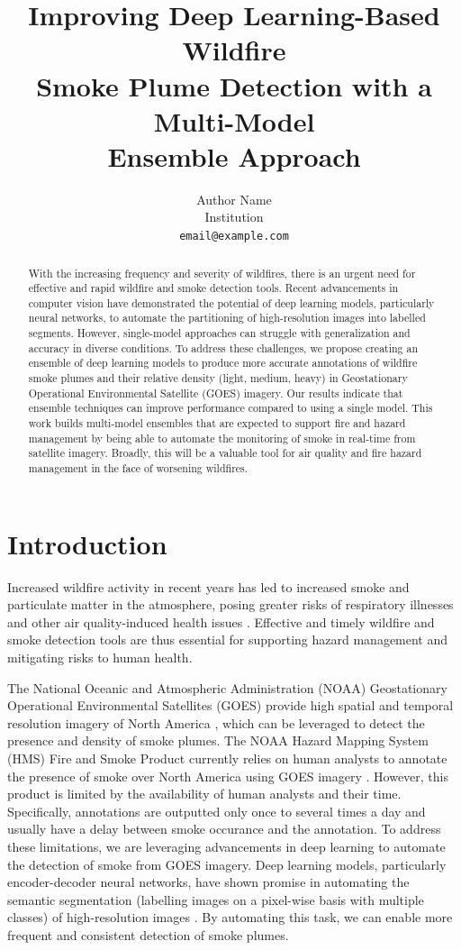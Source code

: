 \documentclass{article}
\title{Improving Deep Learning-Based Wildfire\\ Smoke Plume Detection with a Multi-Model\\ Ensemble Approach}
\author{Author Name \\
Institution \\
\texttt{email@example.com}
}
\begin{document}
\maketitle
\begin{abstract}
With the increasing frequency and severity of wildfires, there is an urgent need for effective and rapid wildfire and smoke detection tools. Recent advancements in computer vision have demonstrated the potential of deep learning models, particularly neural networks, to automate the partitioning of high-resolution images into labelled segments. However, single-model approaches can struggle with generalization and accuracy in diverse conditions. To address these challenges, we propose creating an ensemble of deep learning models to produce more accurate annotations of wildfire smoke plumes and their relative density (light, medium, heavy) in Geostationary Operational Environmental Satellite (GOES) imagery. Our results indicate that ensemble techniques can improve performance compared to using a single model. This work builds multi-model ensembles that are expected to support fire and hazard management by being able to automate the monitoring of smoke in real-time from satellite imagery. Broadly, this will be a valuable tool for air quality and fire hazard management in the face of worsening wildfires.
\end{abstract}

\section{Introduction}
Increased wildfire activity in recent years has led to increased smoke and particulate matter in the atmosphere, posing greater risks of respiratory illnesses and other air quality-induced health issues \citep{wildfire-risk}. Effective and timely wildfire and smoke detection tools are thus essential for supporting hazard management and mitigating risks to human health. 

The National Oceanic and Atmospheric Administration (NOAA) Geostationary Operational Environmental Satellites (GOES) provide high spatial and temporal resolution imagery of North America \citep{GOESbook}, which can be leveraged to detect the presence and density of smoke plumes. The NOAA Hazard Mapping System (HMS) Fire and Smoke Product currently relies on human analysts to annotate the presence of smoke over North America using GOES imagery \citep{hms}. However, this product is limited by the availability of human analysts and their time. Specifically, annotations are outputted only once to several times a day and usually have a delay between smoke occurance and the annotation. To address these limitations, we are leveraging advancements in deep learning to automate the detection of smoke from GOES imagery. Deep learning models, particularly encoder-decoder neural networks, have shown promise in automating the semantic segmentation (labelling images on a pixel-wise basis with multiple classes) of high-resolution images \citep{cv-segmentation-review}. By automating this task, we can enable more frequent and consistent detection of smoke plumes.
\end{document}

